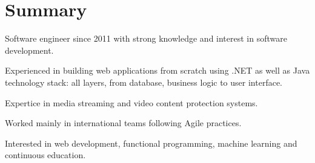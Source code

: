 \section{Summary}

Software engineer since 2011 with strong knowledge and interest in software development.

Experienced in building web applications from scratch using .NET as well as Java technology stack:
all layers, from database, business logic to user interface.

Expertice in media streaming and video content protection systems.

Worked mainly in international teams following Agile practices.

Interested in web development, functional programming, machine learning and continuous education.
